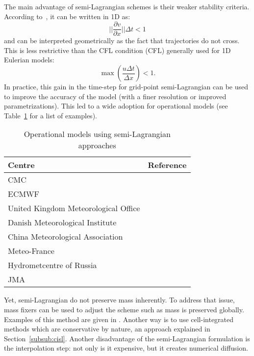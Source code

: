 The main advantage of semi-Lagrangian schemes is their weaker stability
criteria. According to~\cite{Smolarkiewicz1992}, it can be written in 1D as:
\begin{equation}
  ||\frac{\partial v}{\partial x}|| \Delta t < 1
\end{equation}
and can be interpreted geometrically as the fact that trajectories do not cross.
This is less restrictive than the \gls{CFL} condition (CFL) generally
used for 1D Eulerian models:
\begin{equation}
  \max{( \frac{u \Delta t}{\Delta x} )} < 1.
\end{equation}
In practice, this gain in the time-step for grid-point semi-Lagrangian can be
used to improve the accuracy of the model (with a finer resolution or improved
parametrizations). This led to a wide adoption for operational models (see
Table~\ref{tab:sl-models} for a list of examples). 
\begin{table}
  \centering
  \begin{tabular}{ll}
    \toprule
    Centre & Reference \\
    \midrule
    \gls{CMC} &\cite{Cote1998} \\
    \gls{ECMWF} &\cite{Ritchie1995}\\
    United Kingdom Meteorological Office &\cite{Davies2005} \\
    Danish Meteorological Institute &\cite{Nair2002} \\
    China Meteorological Association &\cite{Chen2008} \\
    Meteo-France &\cite{Bubnova1995} \\
    Hydrometcentre of Russia &\cite{Tolstykh2001} \\
    \gls{JMA} &\cite{JMA2013}\\
    \bottomrule
  \end{tabular}
  \caption{Operational models using semi-Lagrangian approaches}
\label{tab:sl-models}
\end{table}
Yet, semi-Lagrangian do not preserve mass inherently. To address that issue,
mass fixers can be used to adjust the scheme such as mass is preserved globally.
Examples of this method are given in
\cite{Priestley1993,Moorthi1993,Williamson1994}. Another way is to use
cell-integrated methods which are conservative by nature, an approach explained
in Section~\ref{subsub:cisl}. Another disadvantage of the semi-Lagrangian
formulation is the interpolation step: not only is it expensive, but it
creates numerical diffusion.

